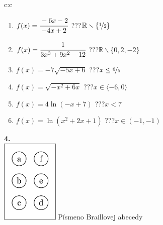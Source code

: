\documentclass[10pt]{report}
\begin{document}
\begin{tabular}{c:c}
\begin{minipage}[c][104.5mm][t]{0.5\linewidth}
\begin{center}
\begin{minipage}{0.79\linewidth}
\begin{center}
\begin{varwidth}{\linewidth}
\begin{enumerate}
\normalsizerrr
\item $f(x)=\cfrac{-6x-2}{-4x+2}$\quad \dotfill\; ???\;\dotfill \quad $\mathbb{R}\smallsetminus\{\nicefrac{1}{2}\}$
\item $f(x)=\cfrac{1}{3x^3+9x^2-12}$\quad \dotfill\; ???\;\dotfill \quad $\mathbb{R}\smallsetminus\{0,2,-2\}$
\item $f(x)=-7\sqrt{-5x+6}$\quad \dotfill\; ???\;\dotfill \quad $x\leq\nicefrac{6}{5}$
\item $f(x)=\sqrt{-x^2+6x}$\quad \dotfill\; ???\;\dotfill \quad $x\in\langle-6 , 0\rangle$
\item $f(x)=4\ln{(-x+7)}$\quad \dotfill\; ???\;\dotfill \quad $x<7$
\item $f(x)=\ln{(x^2+2x+1)}$\quad \dotfill\; ???\;\dotfill \quad $x\in(-1 , -1)$
\end{enumerate}
\end{varwidth}
\end{center}
\end{minipage}
\begin{minipage}{0.20\linewidth}
\begin{center}
{\Huge\bfseries 4.} \\[2mm]
\includegraphics[height=40mm]{../images/braille.png}
{\small Písmeno Braillovej abecedy}
\end{center}
\end{minipage}
\end{center}
\end{minipage}
%
\end{tabular}
\newpage
\thispagestyle{empty}
\end{document}
